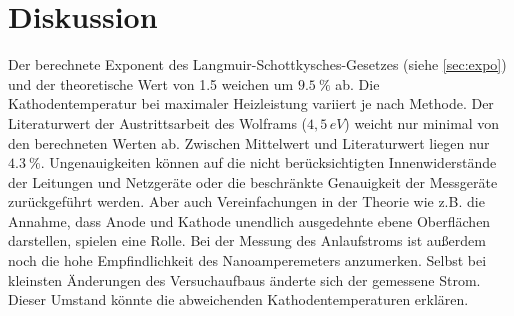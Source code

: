 \section{Diskussion}
\label{sec:Diskussion}

Der berechnete Exponent des Langmuir-Schottkysches-Gesetzes (siehe \ref{sec:expo}) und der theoretische Wert von 1.5 weichen um $\SI{9.5}{\percent}$ ab.
Die Kathodentemperatur bei maximaler Heizleistung variiert je nach Methode.
Der Literaturwert der Austrittsarbeit des Wolframs ($4,5 \, eV$) weicht nur minimal von den berechneten Werten ab.
Zwischen Mittelwert und Literaturwert liegen nur $\SI{4.3}{\percent}$.
Ungenauigkeiten können auf die nicht berücksichtigten Innenwiderstände der Leitungen und Netzgeräte oder die beschränkte Genauigkeit der Messgeräte zurückgeführt werden.
Aber auch Vereinfachungen in der Theorie wie z.B. die Annahme, dass Anode und Kathode unendlich ausgedehnte ebene Oberflächen darstellen, spielen eine Rolle.
Bei der Messung des Anlaufstroms ist außerdem noch die hohe Empfindlichkeit des Nanoamperemeters anzumerken.
Selbst bei kleinsten Änderungen des Versuchaufbaus änderte sich der gemessene Strom.
Dieser Umstand könnte die abweichenden Kathodentemperaturen erklären.
